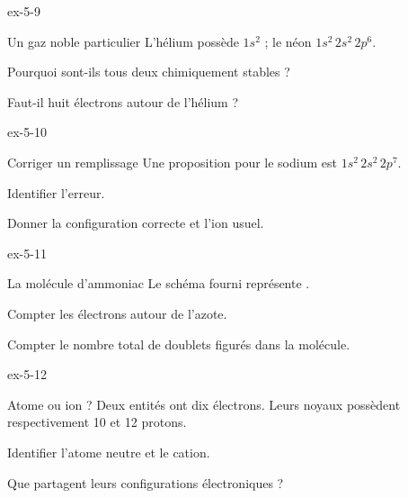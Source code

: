 \begin{blocLivre}{ex-5-9}\begin{exercice}[3]{Un gaz noble particulier}
L’hélium possède $1s^2$ ; le néon $1s^2\,2s^2\,2p^6$.
\begin{questions}
\item Pourquoi sont-ils tous deux chimiquement stables ?
\item Faut-il huit électrons autour de l’hélium ?
\end{questions}
\end{exercice}\end{blocLivre}
\begin{blocLivre}{ex-5-10}\begin{exercice}[3]{Corriger un remplissage}
Une proposition pour le sodium est $1s^2\,2s^2\,2p^7$.
\begin{questions}
\item Identifier l’erreur.
\item Donner la configuration correcte et l’ion usuel.
\end{questions}
\end{exercice}\end{blocLivre}
\begin{blocLivre}{ex-5-11}\begin{exercice}[3]{La molécule d’ammoniac}
Le schéma fourni représente .
\begin{questions}
\item Compter les électrons autour de l’azote.
\item Compter le nombre total de doublets figurés dans la molécule.
\end{questions}
\end{exercice}\end{blocLivre}
\begin{blocLivre}{ex-5-12}\begin{exercice}[3]{Atome ou ion ?}
Deux entités ont dix électrons. Leurs noyaux possèdent respectivement 10 et 12 protons.
\begin{questions}
\item Identifier l’atome neutre et le cation.
\item Que partagent leurs configurations électroniques ?
\end{questions}
\end{exercice}\end{blocLivre}

